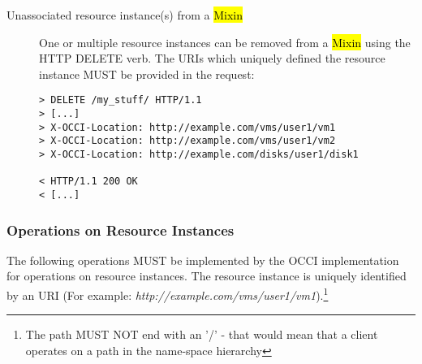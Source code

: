 \documentclass[10pt,a4paper]{article}
\begin{document}
\begin{description}
\item[Unassociated resource instance(s) from a \hl{Mixin}] One or
  multiple resource instances can be removed from a \hl{Mixin} using
  the HTTP DELETE verb. The URIs which uniquely defined the resource
  instance MUST be provided in the request:
\begin{verbatim}
> DELETE /my_stuff/ HTTP/1.1
> [...]
> X-OCCI-Location: http://example.com/vms/user1/vm1
> X-OCCI-Location: http://example.com/vms/user1/vm2
> X-OCCI-Location: http://example.com/disks/user1/disk1

< HTTP/1.1 200 OK
< [...]
\end{verbatim}
\end{description}

\subsubsection{Operations on Resource Instances}
\label{sec:ops_on_instances}
The following operations MUST be implemented by the OCCI
implementation for operations on resource instances. The resource
instance is uniquely identified by an URI (For example:
\emph{http://example.com/vms/user1/vm1}).\footnote{The path MUST NOT
  end with an '/' - that would mean that a client operates on a path
  in the name-space hierarchy}
\end{document}
